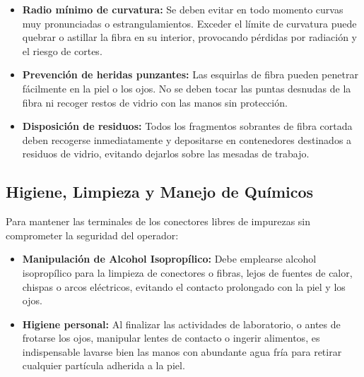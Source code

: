 \begin{itemize}
    \item \textbf{Radio mínimo de curvatura:} Se deben evitar en todo momento curvas muy pronunciadas o estrangulamientos. Exceder el límite de curvatura puede quebrar o astillar la fibra en su interior, provocando pérdidas por radiación y el riesgo de cortes.
    
    \item \textbf{Prevención de heridas punzantes:} Las esquirlas de fibra pueden penetrar fácilmente en la piel o los ojos. No se deben tocar las puntas desnudas de la fibra ni recoger restos de vidrio con las manos sin protección.
    
    \item \textbf{Disposición de residuos:} Todos los fragmentos sobrantes de fibra cortada deben recogerse inmediatamente y depositarse en contenedores destinados a residuos de vidrio, evitando dejarlos sobre las mesadas de trabajo.
\end{itemize}

\subsection{Higiene, Limpieza y Manejo de Químicos}
Para mantener las terminales de los conectores libres de impurezas sin comprometer la seguridad del operador:

\begin{itemize}
    \item \textbf{Manipulación de Alcohol Isopropílico:} Debe emplearse alcohol isopropílico para la limpieza de conectores o fibras, lejos de fuentes de calor, chispas o arcos eléctricos, evitando el contacto prolongado con la piel y los ojos.
    
    \item \textbf{Higiene personal:} Al finalizar las actividades de laboratorio, o antes de frotarse los ojos, manipular lentes de contacto o ingerir alimentos, es indispensable lavarse bien las manos con abundante agua fría para retirar cualquier partícula adherida a la piel.
\end{itemize}